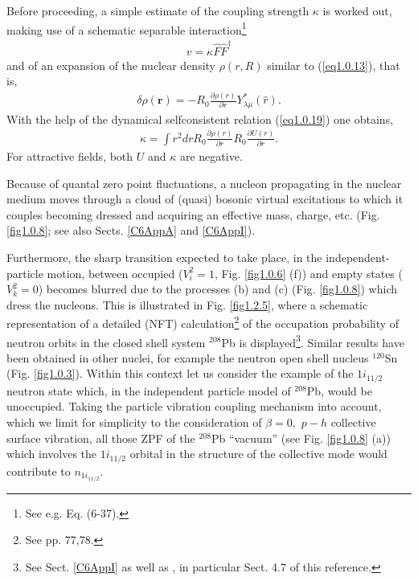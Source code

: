 Before proceeding, a simple estimate of the coupling strength $\kappa$ is worked out, making use of a schematic separable interaction\footnote{See e.g. \cite{Bohr:75} Eq. (6-37).}
\begin{align}\label{eq1.2.9}
v=\kappa\hat F\hat F^\dagger
\end{align}
and of an expansion of the nuclear density $\rho(r,R)$ similar to (\ref{eq1.0.13}), that is,
\begin{align}\label{eq1.2.10}
\delta\rho(\mathbf r)=-R_0\frac{\partial\rho(r)}{\partial r} Y^*_{\lambda\mu}(\hat r).
\end{align}
With the help of the dynamical selfconsistent relation (\ref{eq1.0.19}) one obtains,
\begin{align}\label{eq1.2.11}
\kappa=\int r^2 dr R_0\frac{\partial\rho(r)}{\partial r}R_0\frac{\partial U(r)}{\partial r}.
\end{align}
For attractive fields, both $U$ and $\kappa$ are negative.


Because of quantal zero point fluctuations, a nucleon propagating in the nuclear medium moves through a cloud of (quasi) bosonic  virtual excitations to which it couples becoming dressed and acquiring  an effective mass, charge, etc. (Fig. \ref{fig1.0.8}; see also Sects. \ref{C6AppA} and \ref{C6AppI}). 


Furthermore, the sharp transition expected to take place, in the independent-particle motion, between occupied ($V^2_i=1$, Fig. \ref{fig1.0.6} (f)) and empty states ($V^2_k=0$) becomes blurred due to the processes (b) and (c) (Fig. \ref{fig1.0.8}) which dress the nucleons. This is illustrated in Fig. \ref{fig1.2.5}, where a schematic representation of a detailed (NFT) calculation\footnote{See \cite{Bortignon:98} pp. 77,78.} of the occupation probability of neutron orbits in the closed shell system $^{208}$Pb is displayed\footnote{See Sect. \ref{C6AppI} as well as \cite{Mahaux:85}, in particular Sect. 4.7 of this reference.}. Similar results have been obtained in other nuclei, for example the neutron open shell nucleus $^{120}$Sn (Fig. \ref{fig1.0.3}). Within this context let us consider the example of the $1i_{11/2}$ neutron state which, in the independent particle model of $^{208}$Pb, would be unoccupied. Taking the particle vibration coupling mechanism into account, which we limit for simplicity to the consideration of $\beta=0,$ $p-h$ collective surface vibration, all those ZPF of the $^{208}$Pb ``vacuum'' (see Fig. \ref{fig1.0.8} (a)) which involves the $1i_{11/2}$ orbital in the structure of the collective mode would contribute to $n_{1i_{11/2}}$.

